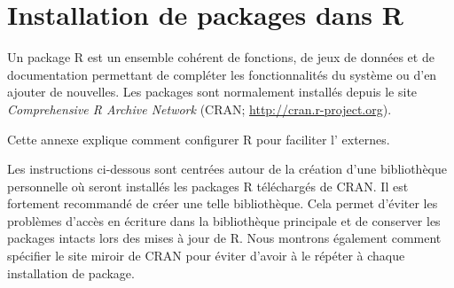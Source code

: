 \chapter{Installation de packages dans R}
\label{packages}

Un package R est un ensemble cohérent de fonctions, de jeux de données
et de documentation permettant de compléter les fonctionnalités du
système ou d'en ajouter de nouvelles. Les packages sont normalement
installés depuis le site \emph{Comprehensive R Archive Network} (CRAN;
\url{http://cran.r-project.org}).

Cette annexe explique comment configurer R pour faciliter l'%
externes.

Les instructions ci-dessous sont centrées autour de la création d'une
bibliothèque personnelle où seront installés les packages R
téléchargés de CRAN. Il est fortement recommandé de créer une telle
bibliothèque. Cela permet d'éviter les problèmes d'accès en écriture
dans la bibliothèque principale et de conserver les packages intacts
lors des mises à jour de R. Nous montrons également comment spécifier
le site miroir de CRAN pour éviter d'avoir à le répéter à chaque
installation de package.
